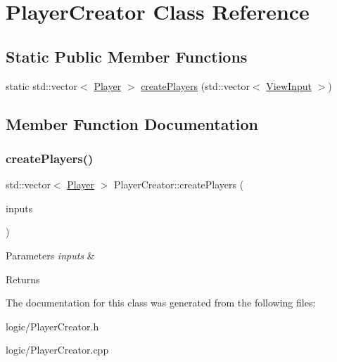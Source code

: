\hypertarget{classPlayerCreator}{}\section{Player\+Creator Class Reference}
\label{classPlayerCreator}
\subsection*{Static Public Member Functions}
\begin{DoxyCompactItemize}
\item 
static std\+::vector$<$ \hyperlink{classPlayer}{Player} $>$ \hyperlink{classPlayerCreator_a67fe8a11ac468ecb1f82391a65252360}{create\+Players} (std\+::vector$<$ \hyperlink{classViewInput}{View\+Input} $>$)
\end{DoxyCompactItemize}


\subsection{Member Function Documentation}
\mbox{\label{classPlayerCreator_a67fe8a11ac468ecb1f82391a65252360}} 
\subsubsection{\texorpdfstring{create\+Players()}{createPlayers()}}
{\footnotesize\ttfamily std\+::vector$<$ \hyperlink{classPlayer}{Player} $>$ Player\+Creator\+::create\+Players (\begin{DoxyParamCaption}\item[{std\+::vector$<$ \hyperlink{classViewInput}{View\+Input} $>$}]{inputs }\end{DoxyParamCaption})\hspace{0.3cm}{\ttfamily [static]}}


\begin{DoxyParams}{Parameters}
{\em inputs} & \\
\hline
\end{DoxyParams}
\begin{DoxyReturn}{Returns}

\end{DoxyReturn}


The documentation for this class was generated from the following files\+:\begin{DoxyCompactItemize}
\item 
logic/Player\+Creator.\+h\item 
logic/Player\+Creator.\+cpp\end{DoxyCompactItemize}
